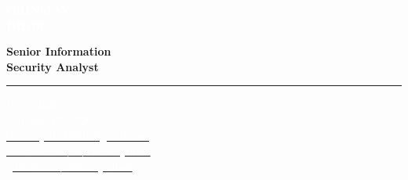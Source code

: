 \documentclass[11pt, letterpaper]{article}
\begin{document}
\pagestyle{empty}


\noindent
\begin{minipage}[t][\textheight]{2.5in}
    \vspace{0.8in}
    \centering
    
    
    \begin{flushleft}
        \hspace{0.3in}
        \begin{minipage}{2in}
            {\Huge \textcolor{white}{\textbf{CHINMAY}}} \\[0.1in]
            {\Huge \textcolor{white}{\textbf{DHOK}}}
            
            \vspace{0.2in}
            
            {\large \textcolor{sidebaraccent}{\textbf{Senior Information}}} \\
            {\large \textcolor{sidebaraccent}{\textbf{Security Analyst}}}
            
            \vspace{0.5in}
            
            \textcolor{white}{\rule{1.5in}{1pt}}
            
            \vspace{0.4in}
            
            \textcolor{white}{
                \faMapMarker* \quad Pune, India \\[0.2in]
                \faPhone \quad +91 702 375 5730 \\[0.2in]
                \faEnvelope \quad \href{mailto:chinmaydhok2013@gmail.com}{\textcolor{white}{chinmaydhok2013@gmail.com}} \\[0.2in]
                \faLinkedin \quad \href{https://linkedin.com/in/chinmaydhok}{\textcolor{white}{linkedin.com/in/chinmaydhok}} \\[0.2in]
                \faGithub \quad \href{https://github.com/chinmay-dhok}{\textcolor{white}{github.com/chinmay-dhok}}
            }
        \end{minipage}
    \end{flushleft}
\end{minipage}%
\end{document}
